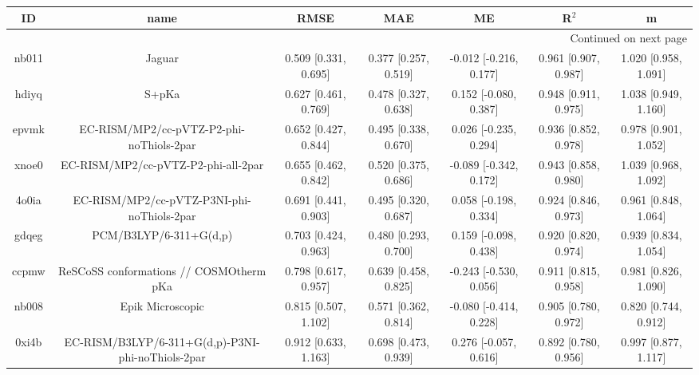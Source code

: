 \documentclass{article}
\begin{document}
\begin{center}
\begin{longtable}{|ccccccc|}
\toprule
    ID &                                               name &                  RMSE &                   MAE &                       ME &                 R$^2$ &                      m \\
\midrule
\endhead
\midrule
\multicolumn{7}{r}{{Continued on next page}} \\
\midrule
\endfoot

\bottomrule
\endlastfoot
 nb011 &                                             Jaguar &  0.509 [0.331, 0.695] &  0.377 [0.257, 0.519] &   -0.012 [-0.216, 0.177] &  0.961 [0.907, 0.987] &   1.020 [0.958, 1.091] \\
 hdiyq &                                              S+pKa &  0.627 [0.461, 0.769] &  0.478 [0.327, 0.638] &    0.152 [-0.080, 0.387] &  0.948 [0.911, 0.975] &   1.038 [0.949, 1.160] \\
 epvmk &           EC-RISM/MP2/cc-pVTZ-P2-phi-noThiols-2par &  0.652 [0.427, 0.844] &  0.495 [0.338, 0.670] &    0.026 [-0.235, 0.294] &  0.936 [0.852, 0.978] &   0.978 [0.901, 1.052] \\
 xnoe0 &                EC-RISM/MP2/cc-pVTZ-P2-phi-all-2par &  0.655 [0.462, 0.842] &  0.520 [0.375, 0.686] &   -0.089 [-0.342, 0.172] &  0.943 [0.858, 0.980] &   1.039 [0.968, 1.092] \\
 4o0ia &         EC-RISM/MP2/cc-pVTZ-P3NI-phi-noThiols-2par &  0.691 [0.441, 0.903] &  0.495 [0.320, 0.687] &    0.058 [-0.198, 0.334] &  0.924 [0.846, 0.973] &   0.961 [0.848, 1.064] \\
 gdqeg &                             PCM/B3LYP/6-311+G(d,p) &  0.703 [0.424, 0.963] &  0.480 [0.293, 0.700] &    0.159 [-0.098, 0.438] &  0.920 [0.820, 0.974] &   0.939 [0.834, 1.054] \\
 ccpmw &            ReSCoSS conformations // COSMOtherm pKa &  0.798 [0.617, 0.957] &  0.639 [0.458, 0.825] &   -0.243 [-0.530, 0.056] &  0.911 [0.815, 0.958] &   0.981 [0.826, 1.090] \\
 nb008 &                                   Epik Microscopic &  0.815 [0.507, 1.102] &  0.571 [0.362, 0.814] &   -0.080 [-0.414, 0.228] &  0.905 [0.780, 0.972] &   0.820 [0.744, 0.912] \\
 0xi4b &  EC-RISM/B3LYP/6-311+G(d,p)-P3NI-phi-noThiols-2par &  0.912 [0.633, 1.163] &  0.698 [0.473, 0.939] &    0.276 [-0.057, 0.616] &  0.892 [0.780, 0.956] &   0.997 [0.877, 1.117] \\

\end{longtable}
\end{center}
\end{document}
